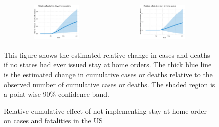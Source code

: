 \documentclass[11pt,reqno,letter]{amsart}
\theoremstyle{definition}
\begin{document}
\begin{figure}[ht]
  \caption{Relative cumulative effect  of  not implementing stay-at-home order on cases and fatalities in the US  \label{fig:US-shelter-dgrowth}}
  \begin{minipage}{\linewidth}
    \centering
    \begin{tabular}{cc}
         \includegraphics[width=0.45\textwidth]{tables_and_figures/us-shelter-rcumu_idx}
      &
        \includegraphics[width=0.45\textwidth]{tables_and_figures/us-shelter-rcumu_deaths_idx}
    \end{tabular}
    \begin{flushleft}
      \footnotesize This figure shows the estimated relative change in
      cases and deaths if no states had ever issued stay at home
      orders. The thick blue line is the estimated change in cumulative
      cases or deaths relative to the observed number of cumulative cases
      or deaths. The shaded region is a point wise 90\% confidence
      band.
    \end{flushleft}
  \end{minipage}
\end{figure}




\end{document}
